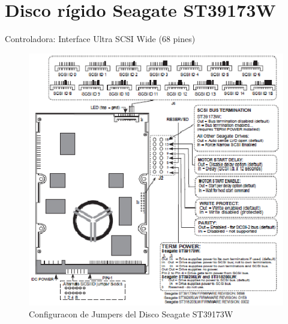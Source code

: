 \documentclass[a4paper]{article}
\begin{document}
%
\sffamily
%
\maketitle
%
% 
\section{Disco rígido Seagate ST39173W}
Controladora: Interface Ultra SCSI Wide (68 pines)
\begin{figure}[H] \begin{center}
\includegraphics[scale=1]{imgs/st39173w_pines.eps} 
\caption{Configuracon de Jumpers del Disco Seagate ST39173W}
\end{center}
\end{figure}

%
\end{document}
